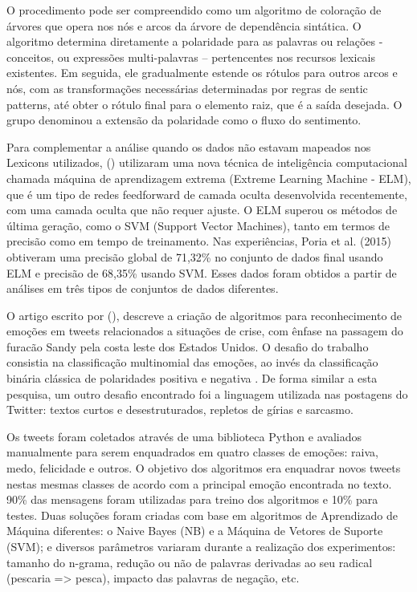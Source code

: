 \documentclass[
	12pt,				%
	openright,			%
	oneside,			%
	a4paper,			%
	english,			%
	spanish,			%
	brazil				%
	]{abntex2}
\begin{document}
O procedimento pode ser compreendido como um algoritmo de coloração de árvores que opera nos nós e arcos da árvore de dependência sintática. O algoritmo determina diretamente a polaridade para as palavras ou relações - conceitos, ou expressões multi-palavras – pertencentes nos recursos lexicais existentes. Em seguida, ele gradualmente estende os rótulos para outros arcos e nós, com as transformações necessárias determinadas por regras de sentic patterns, até obter o rótulo final para o elemento raiz, que é a saída desejada. O grupo denominou a extensão da polaridade como o fluxo do sentimento.

Para complementar a análise quando os dados não estavam mapeados nos Lexicons utilizados,  (\citeyear{article_sentiment_analysis}) utilizaram uma nova técnica de inteligência computacional chamada máquina de aprendizagem extrema (Extreme Learning Machine - ELM), que é um tipo de redes feedforward de camada oculta desenvolvida recentemente, com uma camada oculta que não requer ajuste. O ELM superou os métodos de última geração, como o SVM (Support Vector Machines), tanto em termos de precisão como em tempo de treinamento. Nas experiências, Poria et al. (2015) obtiveram uma precisão global de 71,32\% no conjunto de dados final usando ELM e precisão de 68,35\% usando SVM. Esses dados foram obtidos a partir de análises em três tipos de conjuntos de dados diferentes.


O artigo escrito por  (\citeyear{article_tweet_crisis}), descreve a criação de algoritmos para reconhecimento de emoções em tweets relacionados a situações de crise, com ênfase na passagem do furacão Sandy pela costa leste dos Estados Unidos. O desafio do trabalho consistia na classificação multinomial das emoções, ao invés da classificação binária clássica de polaridades positiva e negativa \cite{article_sentiment_twitter}. De forma similar a esta pesquisa, um outro desafio encontrado foi a linguagem utilizada nas postagens do Twitter: textos curtos e desestruturados, repletos de gírias e sarcasmo.

Os tweets foram coletados através de uma biblioteca Python e avaliados manualmente para serem enquadrados em quatro classes de emoções: raiva, medo, felicidade e outros. O objetivo dos algoritmos era enquadrar novos tweets nestas mesmas classes de acordo com a principal emoção encontrada no texto. 90\% das mensagens foram utilizadas para treino dos algoritmos e 10\% para testes. Duas soluções foram criadas com base em algoritmos de  Aprendizado de Máquina diferentes: o Naive Bayes (NB) e a Máquina de Vetores de Suporte (SVM); e diversos parâmetros variaram durante a realização dos experimentos: tamanho do n-grama, redução ou não de palavras derivadas ao seu radical (pescaria => pesca), impacto das palavras de negação, etc. 
\end{document}
